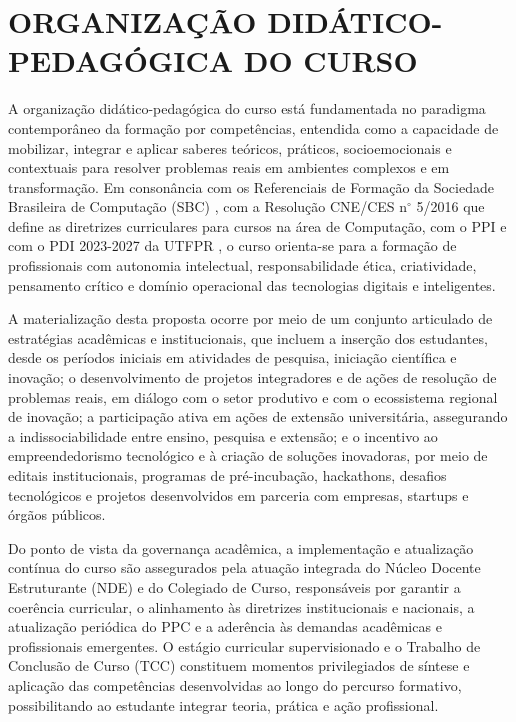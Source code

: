\chapter{ORGANIZAÇÃO DIDÁTICO-PEDAGÓGICA DO CURSO}

A organização didático-pedagógica do curso está fundamentada no paradigma contemporâneo da formação por competências, entendida como a capacidade de mobilizar, integrar e aplicar saberes teóricos, práticos, socioemocionais e contextuais para resolver problemas reais em ambientes complexos e em transformação. Em consonância com os Referenciais de Formação da Sociedade Brasileira de Computação (SBC) \cite{SBC_2017}, com a Resolução CNE/CES n$^\circ$ 5/2016 \cite{MEC_2016} que define as diretrizes curriculares para cursos na área de Computação, com o PPI \cite{UTFPR_PPI_2019} e com o PDI 2023-2027 da UTFPR \cite{UTFPR_PDI_2023}, o curso orienta-se para a formação de profissionais com autonomia intelectual, responsabilidade ética, criatividade, pensamento crítico e domínio operacional das tecnologias digitais e inteligentes.

A materialização desta proposta ocorre por meio de um conjunto articulado de estratégias acadêmicas e institucionais, que incluem a inserção dos estudantes, desde os períodos iniciais em atividades de pesquisa, iniciação científica e inovação; o desenvolvimento de projetos integradores e de ações de resolução de problemas reais, em diálogo com o setor produtivo e com o ecossistema regional de inovação; a participação ativa em ações de extensão universitária, assegurando a indissociabilidade entre ensino, pesquisa e extensão; e o incentivo ao empreendedorismo tecnológico e à criação de soluções inovadoras, por meio de editais institucionais, programas de pré-incubação, hackathons, desafios tecnológicos e projetos desenvolvidos em parceria com empresas, startups e órgãos públicos.

Do ponto de vista da governança acadêmica, a implementação e atualização contínua do curso são assegurados pela atuação integrada do Núcleo Docente Estruturante (NDE) e do Colegiado de Curso, responsáveis por garantir a coerência curricular, o alinhamento às diretrizes institucionais e nacionais, a atualização periódica do PPC e a aderência às demandas acadêmicas e profissionais emergentes. O estágio curricular supervisionado e o Trabalho de Conclusão de Curso (TCC) constituem momentos privilegiados de síntese e aplicação das competências desenvolvidas ao longo do percurso formativo, possibilitando ao estudante integrar teoria, prática e ação profissional.

